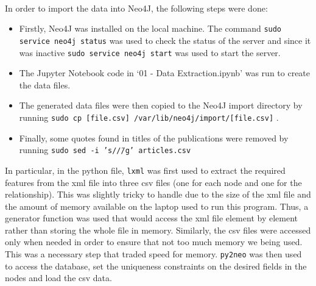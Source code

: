 \paragraph{ }In order to import the data into Neo4J, the following steps were done:
\begin{itemize}
	\item Firstly, Neo4J was installed on the local machine. The command \texttt{sudo service neo4j status} was used to check the status of the server and since it was inactive \texttt{sudo service neo4j start} was used to start the server.
	\item The Jupyter Notebook code in `01 - Data Extraction.ipynb' was run to create the data files.
	\item The generated data files were then copied to the Neo4J import directory by running \texttt{sudo cp [file.csv] /var/lib/neo4j/import/[file.csv]} .
	\item Finally, some quotes found in titles of the publications were removed by running \texttt{sudo sed -i 's/\"//g' articles.csv}
\end{itemize}
In particular, in the python file, \texttt{lxml} was first used to extract the required features from the xml file into three csv files (one for each node and one for the relationship). This was slightly tricky to handle due to the size of the xml file and the amount of memory available on the laptop used to run this program. Thus, a generator function was used that would access the xml file element by element rather than storing the whole file in memory. Similarly, the csv files were accessed only when needed in order to ensure that not too much memory we being used. This was a necessary step that traded speed for memory. \texttt{py2neo} was then used to access the database, set the uniqueness constraints on the desired fields in the nodes and load the csv data.

